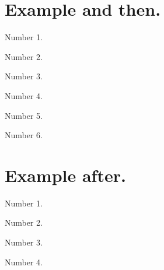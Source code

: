 \documentclass{../main/main}
\begin{document}
\section{Example and then.}

\begin{tdocexa}
    Number 1.
\end{tdocexa}

\begin{tdocexa}
    Number 2.
\end{tdocexa}

\begin{tdocrem}
    Number 3.
\end{tdocrem}

\begin{tdocexa}
    Number 4.
\end{tdocexa}

\begin{tdocrem}
    Number 5.
\end{tdocrem}

\begin{tdocrem}
    Number 6.
\end{tdocrem}


\section{Example after.}

\begin{tdocrem}
    Number 1.
\end{tdocrem}

\begin{tdocrem}
    Number 2.
\end{tdocrem}

\begin{tdocrem}
    Number 3.
\end{tdocrem}

\begin{tdocexa}
    Number 4.
\end{tdocexa}
\end{document}
